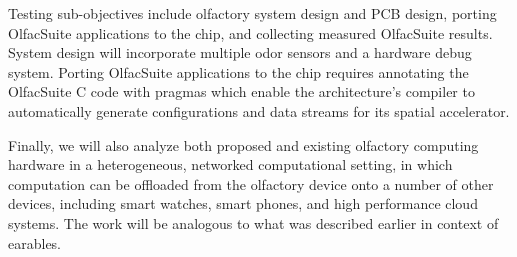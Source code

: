 Testing sub-objectives include olfactory system design and PCB design, porting
OlfacSuite applications to the chip, and collecting measured OlfacSuite
results.  System design will incorporate multiple odor sensors and a hardware
debug system. Porting OlfacSuite applications to the chip requires annotating
the OlfacSuite C code with pragmas which enable the architecture's compiler to
automatically generate configurations and data streams for its spatial
accelerator.
       
Finally, we will also analyze both proposed and existing olfactory computing
hardware in a heterogeneous, networked computational setting, in which
computation can be offloaded from the olfactory device onto a number of other
devices, including smart watches, smart phones, and high performance cloud
systems. The work will be analogous to what was described earlier in context of
earables.


